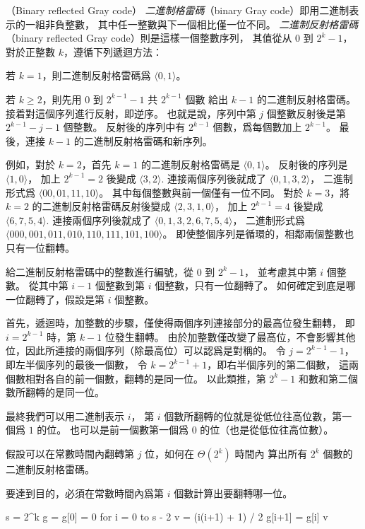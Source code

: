 \startPROBLEM
（Binary reflected Gray code）
\emph{二進制格雷碼}（binary Gray code）即用二進制表示的一組非負整數，
其中任一整數與下一個相比僅一位不同。
\emph{二進制反射格雷碼}（binary reflected Gray code）則是這樣一個整數序列，
其值從从 0 到 $2^k - 1$，對於正整數 $k$，遵循下列遞迴方法：

\startigBase
\item 若 $k=1$，則二進制反射格雷碼爲 $\langle 0, 1\rangle$。

\item 若 $k\ge 2$，則先用 $0$ 到 $2^{k-1}-1$ 共 $2^{k-1}$ 個數
給出 $k-1$ 的二進制反射格雷碼。接着對這個序列進行反射，即逆序。
也就是說，序列中第 $j$ 個整數反射後是第 $2^{k-1}-j-1$ 個整數。
反射後的序列中有 $2^{k-1}$ 個數，爲每個數加上 $2^{k-1}$。
最後，連接 $k-1$ 的二進制反射格雷碼和新序列。
\stopigBase

例如，對於 $k=2$，首先 $k=1$ 的二進制反射格雷碼是 $\langle 0,1\rangle$。
反射後的序列是 $\langle 1,0\rangle$，
加上 $2^{k-1}=2$ 後變成 $\langle 3,2\rangle$.
連接兩個序列後就成了 $\langle 0,1,3,2\rangle$，
二進制形式爲 $\langle 00,01,11,10\rangle$。
其中每個整數與前一個僅有一位不同。
對於 $k=3$，將 $k=2$ 的二進制反射格雷碼反射後變成 $\langle 2,3,1,0\rangle$，
加上 $2^{k-1}=4$ 後變成 $\langle 6,7,5,4\rangle$.
連接兩個序列後就成了 $\langle 0,1,3,2,6,7,5,4\rangle$，
二進制形式爲 $\langle 000,001,011,010,110,111,101,100\rangle$。
即使整個序列是循環的，相鄰兩個整數也只有一位翻轉。

\startigBase[a]\startitem
給二進制反射格雷碼中的整數進行編號，從 $0$ 到 $2^k-1$，
並考慮其中第 $i$ 個整數。
從其中第 $i-1$ 個整數到第 $i$ 個整數，只有一位翻轉了。
如何確定到底是哪一位翻轉了，假設是第 $i$ 個整數。
\stopitem\stopigBase

\startANSWER
首先，遞迴時，加整數的步驟，僅使得兩個序列連接部分的最高位發生翻轉，
即 $i=2^{k-1}$ 時，第 $k-1$ 位發生翻轉。
由於加整數僅改變了最高位，不會影響其他位，因此所連接的兩個序列（除最高位）可以認爲是對稱的。
令 $j=2^{k-1}-1$，即左半個序列的最後一個數，
令 $k=2^{k-1}+1$，即右半個序列的第二個數，
這兩個數相對各自的前一個數，翻轉的是同一位。
以此類推，第 $2^{k}-1$ 和數和第二個數所翻轉的是同一位。

最終我們可以用二進制表示 $i$，
第 $i$ 個數所翻轉的位就是從低位往高位數，第一個爲 $1$ 的位。
也可以是前一個數第一個爲 $0$ 的位（也是從低位往高位數）。
\stopANSWER

\startigBase[a,continue]\startitem
假設可以在常數時間內翻轉第 $j$ 位，如何在 $\Theta(2^k)$ 時間內
算出所有 $2^k$ 個數的二進制反射格雷碼。
\stopitem\stopigBase

\startANSWER
要達到目的，必須在常數時間內爲第 $i$ 個數計算出要翻轉哪一位。

\startCLRSCODE
s = 2^k
g = 
g[0] = 0
for i = 0 to s - 2
	v = (i\oplus(i+1) + 1) / 2
	g[i+1] = g[i] \oplus v
\stopCLRSCODE
\stopANSWER

\stopPROBLEM

